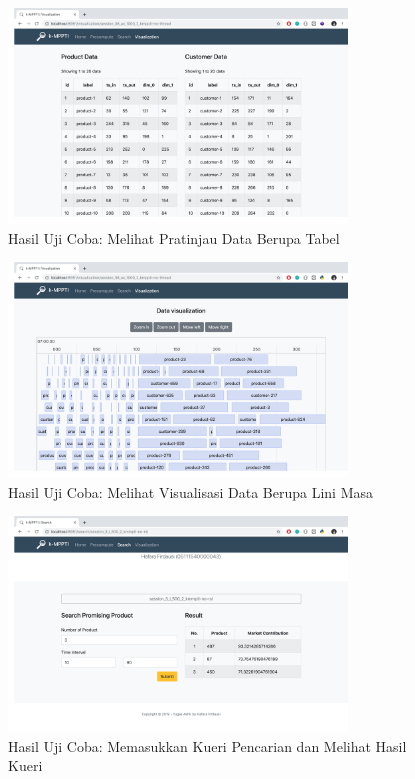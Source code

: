 \begin{figure}[H]
	\centering
	\includegraphics[width=9cm]{assets/img/bab4/hasil4.png}
	\caption{Hasil Uji Coba: Melihat Pratinjau Data Berupa Tabel}
	\label{fig:hasil-performa4}
\end{figure}

\begin{figure}[H]
	\centering
	\includegraphics[width=9cm]{assets/img/bab4/hasil5.png}
	\caption{Hasil Uji Coba: Melihat Visualisasi Data Berupa Lini Masa}
	\label{fig:hasil-performa5}
\end{figure}

\begin{figure}[H]
	\centering
	\includegraphics[width=9cm]{assets/img/bab4/hasil6.png}
	\caption{Hasil Uji Coba: Memasukkan Kueri Pencarian dan Melihat Hasil Kueri}
	\label{fig:hasil-performa6}
\end{figure}


